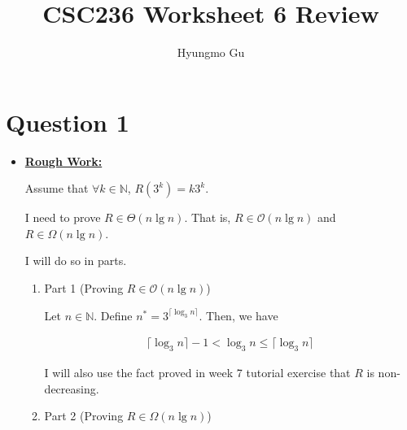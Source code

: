 \documentclass[12pt]{article}
\begin{document}
\title{CSC236 Worksheet 6 Review}
\author{Hyungmo Gu}
\maketitle

\section*{Question 1}
\begin{itemize}
    \item
    \begin{mdframed}
        \underline{\textbf{Rough Work:}}

        \bigskip

        Assume that $\forall k \in \mathbb{N}$, $R(3^k)=k3^k$.

        \bigskip

        I need to prove $R \in \Theta(n \lg n)$. That is, $R \in \mathcal{O}(n \lg n)$
        and $R \in \Omega(n \lg n)$.

        \bigskip

        I will do so in parts.

        \begin{enumerate}[1.]
            \item Part 1 (Proving $R \in \mathcal{O}(n \lg n)$)

            \begin{mdframed}

            Let $n \in \mathbb{N}$. Define $n^* = 3^{\lceil \log_3 n \rceil}$.
            Then, we have

            \begin{align}
                \lceil \log_3 n \rceil - 1 < \log_3 n \leq \lceil \log_3 n \rceil
            \end{align}

            \bigskip

            I will also use the fact proved in week 7 tutorial exercise that
            $R$ is non-decreasing.


            \end{mdframed}

            \item Part 2 (Proving $R \in \Omega(n \lg n)$)
        \end{enumerate}

    \end{mdframed}

\end{itemize}
\end{document}
